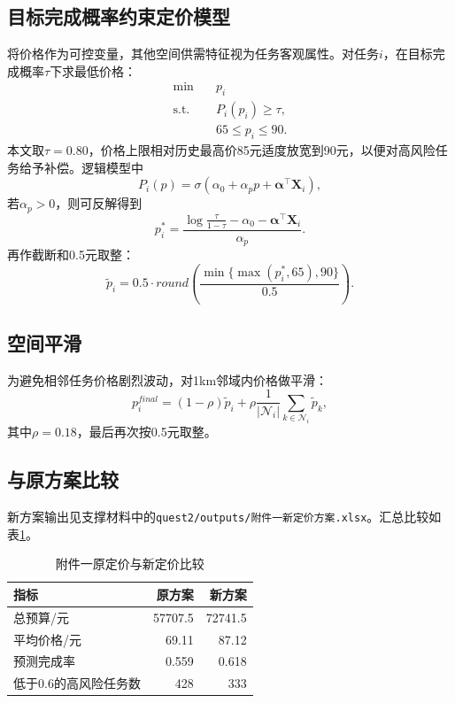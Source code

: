\documentclass[UTF8,a4paper,12pt]{ctexart}
\begin{document}
\subsection{目标完成概率约束定价模型}
将价格作为可控变量，其他空间供需特征视为任务客观属性。对任务$i$，在目标完成概率$\tau$下求最低价格：
\begin{align}
\min\quad &p_i\\
\text{s.t.}\quad &P_i(p_i)\ge\tau,\\
&65\le p_i\le90.
\end{align}
本文取$\tau=0.80$，价格上限相对历史最高价85元适度放宽到90元，以便对高风险任务给予补偿。逻辑模型中
\begin{equation}
P_i(p)=\sigma(\alpha_0+\alpha_p p+\bm\alpha^\top \bm X_i),
\end{equation}
若$\alpha_p>0$，则可反解得到
\begin{equation}
 p_i^*=\frac{\log\frac{\tau}{1-\tau}-\alpha_0-\bm\alpha^\top\bm X_i}{\alpha_p}.
\end{equation}
再作截断和0.5元取整：
\begin{equation}
 \tilde p_i=0.5\cdot round\left(\frac{\min\{\max(p_i^*,65),90\}}{0.5}\right).
\end{equation}

\subsection{空间平滑}
为避免相邻任务价格剧烈波动，对1km邻域内价格做平滑：
\begin{equation}
 p_i^{final}=(1-\rho)\tilde p_i+\rho\frac{1}{|\mathcal N_i|}\sum_{k\in\mathcal N_i}\tilde p_k,
\end{equation}
其中$\rho=0.18$，最后再次按0.5元取整。

\subsection{与原方案比较}
新方案输出见支撑材料中的\texttt{quest2/outputs/附件一新定价方案.xlsx}。汇总比较如表\ref{tab:q2}。

\begin{table}[H]
\centering
\caption{附件一原定价与新定价比较}
\label{tab:q2}
\begin{tabular}{lrr}
\toprule
指标 & 原方案 & 新方案\\
\midrule
总预算/元 & 57707.5 & 72741.5\\
平均价格/元 & 69.11 & 87.12\\
预测完成率 & 0.559 & 0.618\\
低于0.6的高风险任务数 & 428 & 333\\
\bottomrule
\end{tabular}
\end{table}
\end{document}
